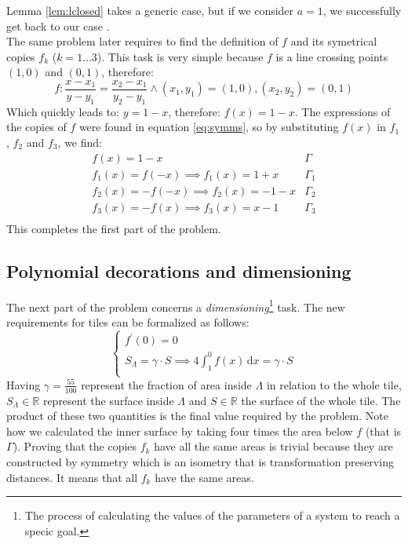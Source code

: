 Lemma \ref{lem:lclosed} takes a generic case, but if we consider $a=1$, we
successfully get back to our case \cite{exam1}.\\

The same problem later requires to find the definition of $f$ and its symetrical
copies $f_k$ ($k = 1 \dots 3$). This task is very simple because $f$ is a line
crossing points $(1,0)$ and $(0,1)$, therefore:
\begin{equation*}
f: \frac{x-x_1}{y-y_1} = \frac{x_2-x_1}{y_2-y_1} \wedge (x_1,y_1) = (1,0), 
(x_2,y_2) = (0,1)
\end{equation*}
Which quickly leads to: $y = 1-x$, therefore: $f(x) = 1-x$. The expressions of the
copies of $f$ were found in equation \ref{eq:symms}, so by substituting $f(x)$
in $f_1$, $f_2$ and $f_3$, we find:
\begin{equation}\label{eq:exprs}
\begin{array}{l|c}
f(x) = 1 - x & \Gamma \\
f_1(x) = f(-x) \implies f_1(x) = 1 + x & \Gamma_1 \\
f_2(x) = -f(-x) \implies f_2(x) = - 1 - x & \Gamma_2 \\
f_3(x) = -f(x) \implies f_3(x) = x - 1 & \Gamma_3 \\
\end{array}
\end{equation}
This completes the first part of the problem.

\subsection{Polynomial decorations and dimensioning}
\label{sec:p1}

The next part of the problem concerns a \emph{dimensioning}\footnote{The
process of calculating the values of the parameters of a system
to reach a specic goal.} task.
The new requirements for tiles can be formalized as follows:
\begin{equation}
\label{eq:fconds2}
\begin{cases}
f^\prime(0) = 0\\
S_{\Lambda} = \gamma \cdot S \implies 
   4 \int^{0}_{1} f(x) \, \mathrm{d} x = \gamma \cdot S\\
\end{cases}
\end{equation}
Having $\gamma = \frac{55}{100}$ represent the fraction of area inside $\Lambda$
in relation to the whole tile, 
$S_{\Lambda} \in \mathbb{R}$ represent the surface 
inside $\Lambda$ and $S \in \mathbb{R}$ the
surface of the whole tile. The product of these two quantities is the final value 
required by the problem. Note how we calculated the inner surface by taking four
times the area below $f$ (that is $\Gamma$). Proving that the copies $f_k$
have all the 
same areas is trivial because they are constructed by symmetry which is 
an isometry that is transformation preserving distances. It means that 
all $f_k$ have the same areas. 

